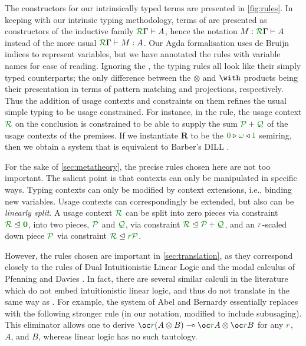 \documentclass[submission,copyright,creativecommons]{eptcs}
\begin{document}
The constructors for our intrinsically typed terms are presented in \autoref{fig:rules}.
In keeping with our intrinsic typing methodology, terms of \name{} are presented as constructors of the inductive family $\ctx\Gamma{R} \vdash A$, hence the notation $M : \ctx\Gamma{R} \vdash A$ instead of the more usual $\ctx\Gamma{R} \vdash M : A$. 
Our Agda formalisation uses de Bruijn indices to represent variables, but we have annotated the rules with variable names for ease of reading. 
Ignoring the , the typing rules all look like their
simply typed counterparts; the only difference between the $\otimes$
and $\with$ products being their presentation in terms of pattern
matching and projections, respectively.
Thus the addition of usage contexts and constraints on them refines the usual simple typing to be usage constrained.
For instance, in the  rule, the usage context $\resctx R$ on the conclusion is constrained to be able to supply the sum $\resctx P + \resctx Q$ of the usage contexts of the premises.
If we instantiate $\mathbf R$ to be the
$\zero \triangleright \unrestricted \triangleleft \linear$ semiring, then we
obtain a system that is equivalent to Barber's DILL \cite{Barber1996}.

For the sake of \autoref{sec:metatheory}, the precise rules chosen here are
not too important.
The salient point is that contexts can only be manipulated in specific ways.
Typing contexts can only be modified by context extensions, i.e., binding new
variables.
Usage contexts can correspondingly be extended, but also can be
\emph{linearly split}.
A usage context $\resctx R$ can be split into zero pieces via constraint
$\resctx R \subres \rescomment{\vct 0}$, into two pieces, $\resctx P$ and
$\resctx Q$, via constraint $\resctx R \subres \resctx P + \resctx Q$, and an
$\rescomment r$-scaled down piece $\resctx P$ via constraint
$\resctx R \subres \rescomment r\resctx P$.

However, the rules chosen are important in \autoref{sec:translation}, as they
correspond closely to the rules of Dual Intuitionistic Linear Logic and the
modal calculus of Pfenning and Davies \cite{Barber1996,judgmental}.
In fact, there are several similar calculi in the literature which do not
embed intuitionistic linear logic, and thus do not translate in the same way as
\name{}.
For example, the system of Abel and Bernardy \cite{AbelBernardy2020}
essentially replaces  with the following stronger
rule (in our notation, modified to include subusaging).
This eliminator allows one to derive
$\fun{\excl r{(\tensor A B)}}{\tensor{\excl r A}{\excl r B}}$ for any
$\rescomment r$, $A$, and $B$, whereas linear logic has no such tautology.
\end{document}
